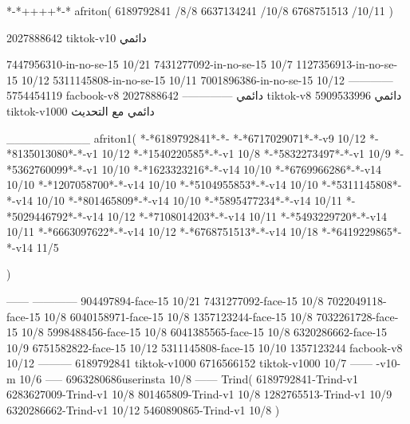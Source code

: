 *-*++++*-*
afriton(
6189792841 /8/8
6637134241 /10/8
6768751513 /10/11
)

2027888642 tiktok-v10
دائمي


7447956310-in-no-se-15 10/21
7431277092-in-no-se-15 10/7
1127356913-in-no-se-15 10/12
5311145808-in-no-se-15 10/11
7001896386-in-no-se-15 10/12
------------
5754454119 facbook-v8
دائمي
--------------
2027888642 tiktok-v8
دائمي
5909533996 tiktok-v1000
دائمي مع التحديث

__________
afriton1(
*-*6189792841*-*-
*-*6717029071*-*-v9 10/12
*-*8135013080‌*-*-v1 10/12
*-*1540220585*-*-v1 10/8
*-*5832273497*-*-v1 10/9
*-*5362760099*-*-v1 10/10
*-*1623323216*-*-v14 10/10
*-*6769966286*-*-v14 10/10
*-*1207058700*-*-v14 10/10
*-*5104955853*-*-v14 10/10
*-*5311145808*-*-v14 10/10
*-*801465809*-*-v14 10/10
*-*5895477234*-*-v14 10/11
*-*5029446792*-*-v14 10/12
*-*7108014203*-*-v14 10/11
*-*5493229720*-*-v14 10/11
*-*6663097622*-*-v14 10/12
*-*6768751513*-*-v14 10/18
*-*6419229865*-*-v14 11/5


)

------
------------
904497894-face-15 10/21
7431277092-face-15 10/8
7022049118-face-15 10/8
6040158971-face-15 10/8
1357123244-face-15 10/8
7032261728-face-15 10/8
5998488456-face-15 10/8
6041385565-face-15 10/8
6320286662-face-15 10/9
6751582822-face-15 10/12
5311145808-face-15 10/10
1357123244 facbook-v8 10/12
---------
6189792841 tiktok-v1000
6716566152 tiktok-v1000
10/7
------
-v10-m 10/6
-----
6963280686userinsta 10/8
------
Trind(
6189792841-Trind-v1 
6283627009-Trind-v1 10/8
801465809-Trind-v1 10/8
1282765513-Trind-v1 10/9
6320286662-Trind-v1 10/12
5460890865-Trind-v1 10/8
)
